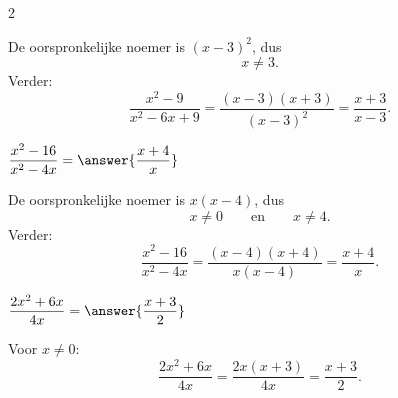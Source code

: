 \documentclass{ximera}
\begin{document}
\begin{oefening}[Breuken]{\oefB\ESS}
\begin{multicols}{2}
\begin{question}
        \begin{oplossing}
        De oorspronkelijke noemer is $(x-3)^2$, dus
        \[
        x\neq3.
        \]
        Verder:
        \[
        \dfrac{x^2-9}{x^2-6x+9}
        =\dfrac{(x-3)(x+3)}{(x-3)^2}
        =\dfrac{x+3}{x-3}.
        \]
        \end{oplossing}
        \end{question}
        
        
        \begin{question}
        $\dfrac{x^2-16}{x^2-4x}
        =\answer{\dfrac{x+4}{x}}$
        
        \begin{oplossing}
        De oorspronkelijke noemer is $x(x-4)$, dus
        \[
        x\neq0
        \qquad\text{en}\qquad
        x\neq4.
        \]
        Verder:
        \[
        \dfrac{x^2-16}{x^2-4x}
        =\dfrac{(x-4)(x+4)}{x(x-4)}
        =\dfrac{x+4}{x}.
        \]
        \end{oplossing}
        \end{question}
        
        
        \begin{question}
        $\dfrac{2x^2+6x}{4x}
        =\answer{\dfrac{x+3}{2}}$
        
        \begin{oplossing}
        Voor $x\neq0$:
        \[
        \dfrac{2x^2+6x}{4x}
        =\dfrac{2x(x+3)}{4x}
        =\dfrac{x+3}{2}.
        \]
        \end{oplossing}
        \end{question}
        
        \end{multicols}
        
        \end{oefening}
\end{document}
